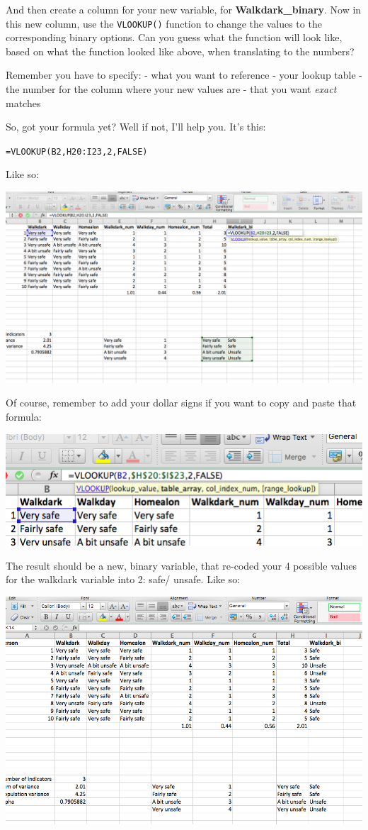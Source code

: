 \documentclass[]{book}
\theoremstyle{definition}
\theoremstyle{definition}
\theoremstyle{definition}
\theoremstyle{remark}
\begin{document}
And then create a column for your new variable, for
\textbf{Walkdark\_binary}. Now in this new column, use the
\texttt{VLOOKUP()} function to change the values to the corresponding
binary options. Can you guess what the function will look like, based on
what the function looked like above, when translating to the numbers?

Remember you have to specify: - what you want to reference - your lookup
table - the number for the column where your new values are - that you
want \emph{exact} matches

So, got your formula yet? Well if not, I'll help you. It's this:

\texttt{=VLOOKUP(B2,H20:I23,2,FALSE)}

Like so:

\includegraphics{imgs/binary_vlookup.png}

Of course, remember to add your dollar signs if you want to copy and
paste that formula:

\includegraphics{imgs/add_dolla_lookup.png}

The result should be a new, binary variable, that re-coded your 4
possible values for the walkdark variable into 2: safe/ unsafe. Like so:

\includegraphics{imgs/final_binary_recode.png}
\end{document}
